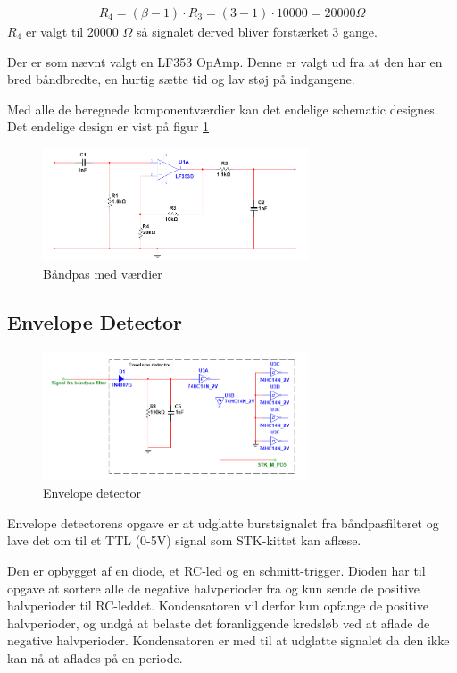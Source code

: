 \begin{align}
R_4 = (\beta - 1) \cdot R_3 = (3 - 1) \cdot 10000 = 20000 \Omega
\end{align} 
$R_4$ er valgt til 20000 $\Omega$ så signalet derved bliver forstærket 3 gange.

Der er som nævnt valgt en LF353 OpAmp. Denne er valgt ud fra at den har en bred båndbredte, en hurtig sætte tid og lav støj på indgangene. 

Med alle de beregnede komponentværdier kan det endelige schematic designes. Det endelige design er vist på figur \ref{fig:BAANDPAS_MV} 

\begin{figure}[htbp]
	\centering
	\includegraphics[width=0.70\textwidth]{billeder/HWdesign/BAANDPAS_MV.png}
	\caption{Båndpas med værdier}
	\label{fig:BAANDPAS_MV}
\end{figure}
 

\newpage

\subsection{Envelope Detector}

\begin{figure}[htbp]
	\centering
	\includegraphics[width=0.70\textwidth]{billeder/HWdesign/ED_MV.png}
	\caption{Envelope detector}
	\label{fig:ED_MV}
\end{figure}

Envelope detectorens opgave er at udglatte burstsignalet fra båndpasfilteret og lave det om til et TTL (0-5V) signal som STK-kittet kan aflæse.

Den er opbygget af en diode, et RC-led og en schmitt-trigger. Dioden har til opgave at sortere alle de negative halvperioder fra og kun sende de positive halvperioder til RC-leddet. Kondensatoren vil derfor kun opfange de positive halvperioder, og undgå at belaste det foranliggende kredsløb ved at aflade de negative halvperioder. Kondensatoren er med til at udglatte signalet da den ikke kan nå at aflades på en periode.

